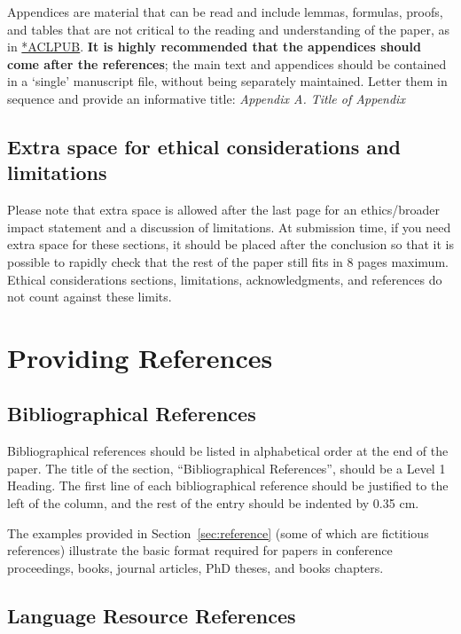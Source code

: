\documentclass[10pt, a4paper]{article}
\begin{document}
Appendices are material that can be read and include lemmas, formulas, proofs, and tables that are not critical to the reading and understanding of the paper, as in \href{https://acl-org.github.io/ACLPUB/formatting.html#appendices}{*ACLPUB}. \textbf{It is  highly recommended that the appendices should come after the references}; the main text and appendices should be contained in a `single' manuscript file, without being separately maintained. Letter them in sequence and provide an informative title: \textit{Appendix A. Title of Appendix}


\subsection{Extra space for ethical considerations and limitations}

Please note that extra space is allowed after the last page for an ethics/broader impact statement and a discussion of limitations. At submission time, if you need extra space for these sections, it should be placed after the conclusion so that it is possible to rapidly check that the rest of the paper still fits in 8 pages maximum. Ethical considerations sections, limitations, acknowledgments, and references do not count against these limits.

\section{Providing References}

\subsection{Bibliographical References} 

Bibliographical references should be listed in alphabetical order at the end of the paper. The title of the section, ``Bibliographical References'', should be a Level 1 Heading. The first line of each bibliographical reference should be justified to the left of the column, and the rest of the entry should be indented by 0.35 cm.

The examples provided in Section~\ref{sec:reference} (some of which are fictitious references) illustrate the basic format required for papers in conference proceedings, books, journal articles, PhD theses, and books chapters.

\subsection{Language Resource References}
\end{document}
